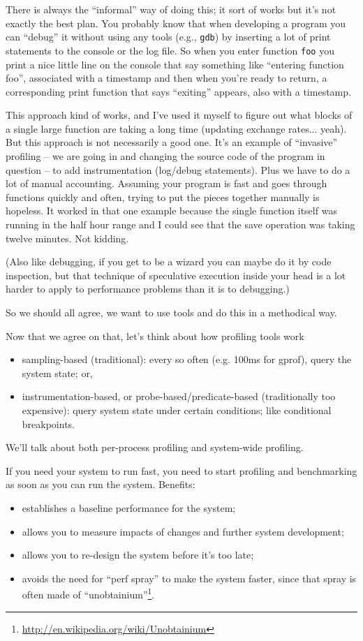 There is always the ``informal'' way of doing this; it sort of works but it's not exactly the best plan. You probably know that when developing a program you can ``debug'' it without using any tools (e.g., \texttt{gdb}) by inserting a lot of print statements to the console or the log file. So when you enter function \texttt{foo} you print a nice little line on the console that say something like ``entering function foo'', associated with a timestamp and then when you're ready to return, a corresponding print function that says ``exiting'' appears, also with a timestamp.

This approach kind of works, and I've used it myself to figure out what blocks of a single large function are taking a long time (updating exchange rates... yeah). But this approach is not necessarily a good one.  It's an example of ``invasive'' profiling -- we are going in and changing the source code of the program in question -- to add instrumentation (log/debug statements). Plus we have to do a lot of manual accounting. Assuming your program is fast and goes through functions quickly and often, trying to put the pieces together manually is hopeless. It worked in that one example because the single function itself was running in the half hour range and I could see that the save operation was taking twelve minutes. Not kidding. 

(Also like debugging, if you get to be a wizard you can maybe do it by code inspection, but that technique of speculative execution inside your head is a lot harder to apply to performance problems than it is to debugging.)

So we should all agree, we want to use tools and do this in a methodical way.

Now that we agree on that, let's think about how profiling tools work\:

\begin{itemize}
\item sampling-based (traditional): every so often (e.g. 100ms for gprof), query the
system state; or,
\item instrumentation-based, or probe-based/predicate-based
  (traditionally too expensive): query system state under certain
  conditions; like conditional breakpoints.
\end{itemize}
We'll talk about both per-process profiling and system-wide profiling.

If you need your system to run fast, you need to start profiling
and benchmarking as soon as you can run the system. Benefits:
\begin{itemize}
\item establishes a baseline performance for the system;
\item allows you to measure impacts of changes and further system development;
\item allows you to re-design the system before it's too late;
\item avoids the need for ``perf spray'' to make the system faster, since
that spray is often made of ``unobtainium''\footnote{\url{http://en.wikipedia.org/wiki/Unobtainium}}.
\end{itemize}


